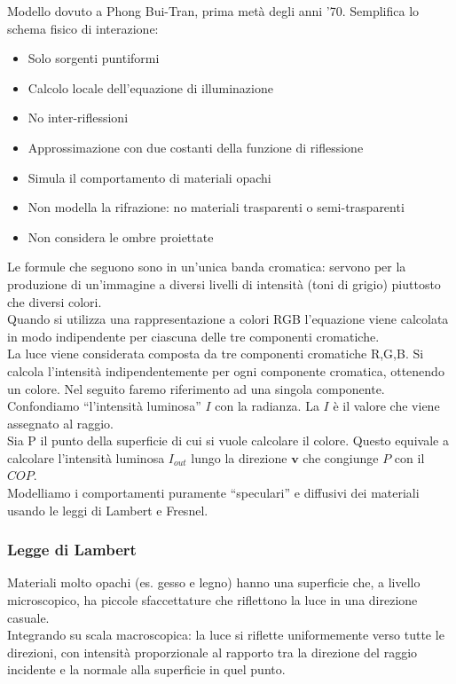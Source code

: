\documentclass[a4paper, 10pt]{article}
\renewcommand{\vec}{\bm}
\begin{document}
			\bigskip
		
			\noindent
			Modello dovuto a Phong Bui-Tran, prima metà degli anni '70.
			Semplifica lo schema fisico di interazione:
			\begin{itemize}
				\item Solo sorgenti puntiformi
				\item Calcolo locale dell’equazione di illuminazione
				\item No inter-riflessioni
				\item Approssimazione con due costanti della funzione di riflessione
				\item Simula il comportamento di materiali opachi
				\item Non modella la rifrazione: no materiali trasparenti o semi-trasparenti
				\item Non considera le ombre proiettate
			\end{itemize}
			Le formule che seguono sono in un’unica banda cromatica:
			servono per la produzione di un’immagine a diversi livelli di
			intensità (toni di grigio) piuttosto che diversi colori.\\
			Quando si utilizza una rappresentazione a colori RGB
			l’equazione viene calcolata in modo indipendente per ciascuna
			delle tre componenti cromatiche.\\
			La luce viene considerata composta da tre componenti
			cromatiche R,G,B. Si calcola l’intensità indipendentemente per
			ogni componente cromatica, ottenendo un colore. 
			Nel seguito faremo riferimento ad una singola componente.\\
			Confondiamo “l’intensità luminosa” $ I $ con la radianza. La $ I $ è il
			valore che viene assegnato al raggio.\\
			Sia P il punto della superficie di cui si vuole calcolare il colore.
			Questo equivale a calcolare l’intensità luminosa $ I_{out} $ lungo la
			direzione $ \vec{v} $ che congiunge $ P $ con il $ COP $.\\
			Modelliamo i comportamenti puramente “speculari” e diffusivi
			dei materiali usando le leggi di Lambert e Fresnel.
			
		\subsubsection{Legge di Lambert}
			Materiali molto opachi (es.	gesso e legno) hanno una
			superficie che, a livello microscopico, ha piccole
			sfaccettature che riflettono la luce in una direzione casuale.\\
			Integrando su scala macroscopica: la luce si riflette
			uniformemente verso tutte le direzioni, con intensità
			proporzionale al rapporto tra la direzione del raggio incidente e
			la normale alla superficie in quel punto.
			
\end{document}
